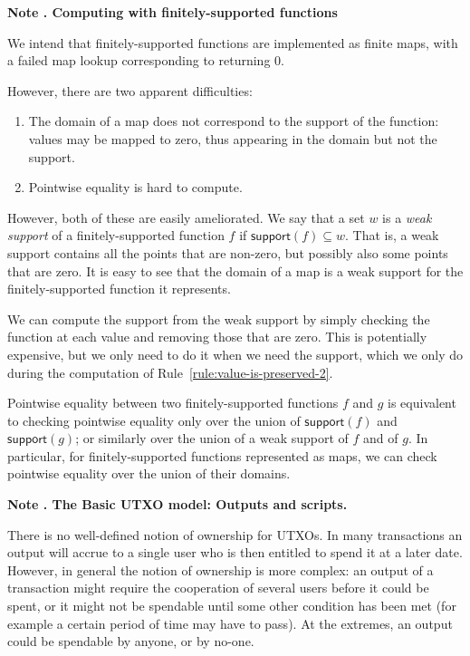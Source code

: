 \documentclass[a4paper]{article}
\newcounter{note}
\newcommand{\note}[1]{
  \bigskip
  \refstepcounter{note}
  \noindent\textbf{Note \thenote. #1}
}
\newcommand{\msf}[1]{\ensuremath{\mathsf{#1}}}
\newcommand{\support}{\msf{support}}
\begin{document}
\note{Computing with finitely-supported functions}
\label{note:finitely-supported-functions}

We intend that finitely-supported functions are implemented as finite
maps, with a failed map lookup corresponding to returning 0.

However, there are two apparent difficulties:
\begin{enumerate}
  \item The domain of a map does not correspond to the support of the function:
    values may be mapped to zero, thus appearing in the domain but not the support.
  \item Pointwise equality is hard to compute.
\end{enumerate}

However, both of these are easily ameliorated. We say that a set $w$ is a \textit{weak support}
of a finitely-supported function $f$ if $\support(f) \subseteq w$. That is, a
weak support contains all the points that are non-zero, but possibly also some
points that are zero. It is easy to see that the domain of a map is a weak
support for the finitely-supported function it represents.

We can compute the support from the weak support by simply checking the function
at each value and removing those that are zero. This is potentially expensive,
but we only need to do it when we need the support, which we only do during the
computation of Rule~\ref{rule:value-is-preserved-2}.

Pointwise equality between two finitely-supported functions $f$ and $g$ is
equivalent to checking pointwise equality only over the union of $\support(f)$
and $\support(g)$; or similarly over the union of a weak support of $f$ and of
$g$. In particular, for finitely-supported functions represented as maps, we can
check pointwise equality over the union of their domains.

\note{The Basic UTXO model: Outputs and scripts.}
\label{note:basic-utxo}
There is no well-defined notion of ownership for UTXOs.  In many
transactions an output will accrue to a single user who is then
entitled to spend it at a later date.  However, in general the notion
of ownership is more complex: an output of a transaction might require
the cooperation of several users before it could be spent, or it might
not be spendable until some other condition has been met (for example
a certain period of time may have to pass).  At the extremes, an
output could be spendable by anyone, or by no-one.
\end{document}
